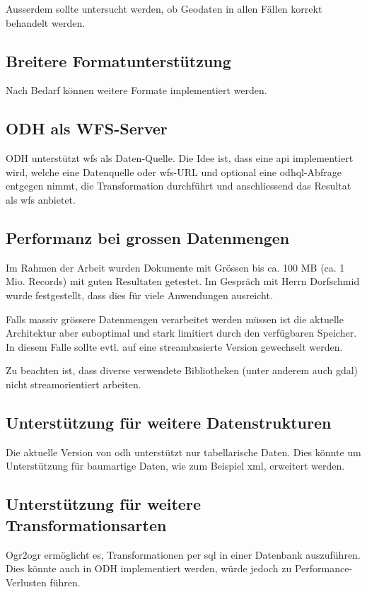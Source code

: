 Ausserdem sollte untersucht werden, ob Geodaten in allen Fällen korrekt behandelt werden.

\subsection{Breitere Formatunterstützung}
Nach Bedarf können weitere Formate implementiert werden.

\subsection{ODH als WFS-Server}
ODH unterstützt \acs{wfs} als Daten-Quelle. Die Idee ist, dass eine \acs{api} implementiert wird, welche eine Datenquelle oder \acs{wfs}-URL und optional eine \acs{odhql}-Abfrage entgegen nimmt, die Transformation durchführt und anschliessend das Resultat als \acs{wfs} anbietet.

\subsection{Performanz bei grossen Datenmengen}
Im Rahmen der Arbeit wurden Dokumente mit Grössen bis ca. 100 MB (ca. 1 Mio. Records) mit guten Resultaten getestet. Im Gespräch mit Herrn Dorfschmid wurde festgestellt, dass dies für viele Anwendungen ausreicht.

Falls massiv grössere Datenmengen verarbeitet werden müssen ist die aktuelle Architektur aber suboptimal und stark limitiert durch den verfügbaren Speicher. In diesem Falle sollte evtl. auf eine streambasierte Version gewechselt werden.

Zu beachten ist, dass diverse verwendete Bibliotheken (unter anderem auch \gls{gdal}) nicht streamorientiert arbeiten.

\subsection{Unterstützung für weitere Datenstrukturen}
Die aktuelle Version von \acs{odh} unterstützt nur tabellarische Daten. Dies könnte um Unterstützung für baumartige Daten, wie zum Beispiel \acs{xml}, erweitert werden. 

\subsection{Unterstützung für weitere Transformationsarten}
Ogr2ogr ermöglicht es, Transformationen per \acs{sql} in einer Datenbank auszuführen. Dies könnte auch in ODH implementiert werden, würde jedoch zu Performance-Verlusten führen.


